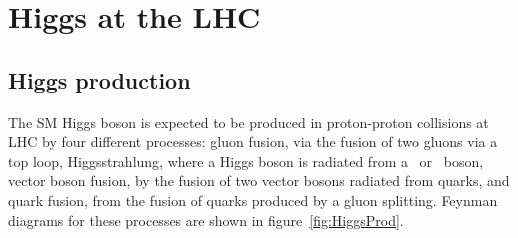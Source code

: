 %
%

\section{Higgs at the LHC}
\subsection{Higgs production}

The SM Higgs boson is expected to be produced in proton-proton collisions at LHC by four different processes: gluon fusion, via the fusion of two gluons via a top loop, Higgsstrahlung, where a Higgs boson is radiated from a \Z~or \W~boson, vector boson fusion, by the fusion of two vector bosons radiated from quarks, and quark fusion, from the fusion of quarks produced by a gluon splitting. Feynman diagrams for these processes are shown in figure~\ref{fig:HiggsProd}. 

